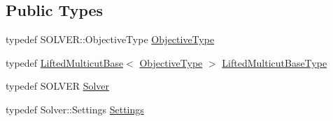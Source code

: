 \subsection*{Public Types}
\begin{DoxyCompactItemize}
\item 
typedef S\+O\+L\+V\+E\+R\+::\+Objective\+Type \hyperlink{classnifty_1_1graph_1_1optimization_1_1lifted__multicut_1_1LiftedMulticutFactory_ada46abb25bb84f394d4e97d30fe24d3c}{Objective\+Type}
\item 
typedef \hyperlink{classnifty_1_1graph_1_1optimization_1_1lifted__multicut_1_1LiftedMulticutBase}{Lifted\+Multicut\+Base}$<$ \hyperlink{classnifty_1_1graph_1_1optimization_1_1lifted__multicut_1_1LiftedMulticutFactory_ada46abb25bb84f394d4e97d30fe24d3c}{Objective\+Type} $>$ \hyperlink{classnifty_1_1graph_1_1optimization_1_1lifted__multicut_1_1LiftedMulticutFactory_a44718e3998cb1f019bad0e38832fcac0}{Lifted\+Multicut\+Base\+Type}
\item 
typedef S\+O\+L\+V\+E\+R \hyperlink{classnifty_1_1graph_1_1optimization_1_1lifted__multicut_1_1LiftedMulticutFactory_a70b6d5ca05f0323b33264230ed3956ed}{Solver}
\item 
typedef Solver\+::\+Settings \hyperlink{classnifty_1_1graph_1_1optimization_1_1lifted__multicut_1_1LiftedMulticutFactory_ab2aea76dcf9e713d3d8a011d87eaaf77}{Settings}
\end{DoxyCompactItemize}
